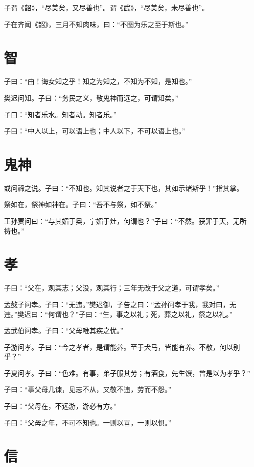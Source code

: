 \documentclass[a5paper]{ctexbook}
\begin{document}
    子谓《韶》，“尽美矣，又尽善也”。谓《武》，“尽美矣，未尽善也”。

    子在齐闻《韶》，三月不知肉味，曰：“不图为乐之至于斯也。”

    \chapter{智}

    子曰：“由！诲女知之乎！知之为知之，不知为不知，是知也。”

    樊迟问知。子曰：“务民之义，敬鬼神而远之，可谓知矣。”
    
    子曰：“知者乐水。知者动。知者乐。”

    子曰：“中人以上，可以语上也；中人以下，不可以语上也。”

    \chapter{鬼神}

    或问禘之说。子曰：“不知也。知其说者之于天下也，其如示诸斯乎！”指其掌。

    祭如在，祭神如神在。子曰：“吾不与祭，如不祭。”

    王孙贾问曰：“与其媚于奥，宁媚于灶，何谓也？”子曰：“不然。获罪于天，无所祷也。”

    \chapter{孝}

    子曰：“父在，观其志；父没，观其行；三年无改于父之道，可谓孝矣。”

    孟懿子问孝。子曰：“无违。”樊迟御，子告之曰：“孟孙问孝于我，我对曰，无违。”樊迟曰：“何谓也？”子曰：“生，事之以礼；死，葬之以礼，祭之以礼。”

    孟武伯问孝。子曰：“父母唯其疾之忧。”

    子游问孝。子曰：“今之孝者，是谓能养。至于犬马，皆能有养。不敬，何以别乎？”

    子夏问孝。子曰：“色难。有事，弟子服其劳；有酒食，先生馔，曾是以为孝乎？”

    子曰：“事父母几谏，见志不从，又敬不违，劳而不怨。”

    子曰：“父母在，不远游，游必有方。”

    子曰：“父母之年，不可不知也。一则以喜，一则以惧。”

    \chapter{信}
\end{document}
